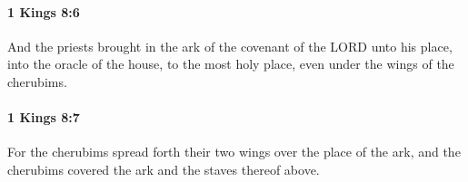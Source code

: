 		\paragraph{1 Kings 8:6} %
			\label{1KINGS-8-6}

			And the priests brought in the ark of the covenant of the LORD unto his place, into the oracle of the house, to the most holy place, even under the wings of the cherubims.


		\paragraph{1 Kings 8:7} %
			\label{1KINGS-8-7}

			For the cherubims spread forth their two wings over the place of the ark, and the cherubims covered the ark and the staves thereof above.


